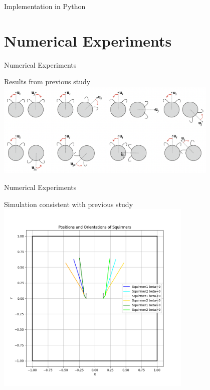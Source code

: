 \documentclass{beamer}
\begin{document}
\begin{frame}{Implementation in Python}
\section{Numerical Experiments}
\begin{frame}{Numerical Experiments}
    \begin{center}
        Results from previous study \cite{Stark}
        \includegraphics[width=0.8\textwidth]{../images/stark_behavior.png}
        \cite{Stark}
    \end{center}
\end{frame}

\begin{frame}{Numerical Experiments}
    \begin{center}
        Simulation consistent with previous study \cite{Stark}
        \includegraphics[width=0.7\textwidth]{../../graphs/simulations/twosquirmerinter/sq2.pi.2.png}
    \end{center}
\end{frame}


\end{frame}
\end{document}
